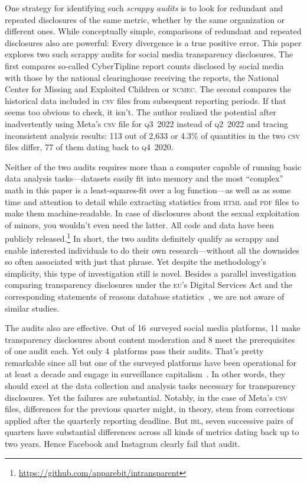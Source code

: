 \documentclass[nonacm,screen]{acmart}
\newcommand\V[1]{\textsc{\MakeLowercase{#1}}}
\begin{document}
\begin{itemize}
{One strategy for identifying such \emph{scrappy audits} is to look for redundant
and repeated disclosures of the same metric, whether by the same organization or
different ones. While conceptually simple, comparisons of redundant and repeated
disclosures also are powerful: Every divergence is a true positive error. This
paper explores two such scrappy audits for social media transparency
disclosures. The first compares so-called CyberTipline report counts disclosed
by social media with those by the national clearinghouse receiving the reports,
the National Center for Missing and Exploited Children or \V{NCMEC}. The second
compares the historical data included in \V{CSV} files from subsequent reporting
periods. If that seems too obvious to check, it isn't. The author realized the
potential after inadvertently using Meta's \V{CSV} file for \V{Q3}~2022 instead
of \V{Q2}~2022 and tracing inconsistent analysis results: 113 out of 2,633 or
4.3\% of quantities in the two \V{CSV} files differ, 77 of them dating back to
\V{Q4}~2020.

Neither of the two audits requires more than a computer capable of running basic
data analysis tasks---datasets easily fit into memory and the most ``complex''
math in this paper is a least-squares-fit over a log function---as well as as
some time and attention to detail while extracting statistics from \V{HTML} and
\V{PDF} files to make them machine-readable. In case of disclosures about the
sexual exploitation of minors, you wouldn't even need the latter. All code and
data have been publicly
released.\footnote{\label{fn:intransparent}\url{https://github.com/apparebit/intransparent}}
In short, the two audits definitely qualify as scrappy and enable interested
individuals to do their own research---without all the downsides so often
associated with just that phrase. Yet despite the methodology's simplicity, this
type of investigation still is novel. Besides a parallel investigation comparing
transparency disclosures under the \V{EU}'s Digital Services Act and the
corresponding statements of reasons database
statistics~\cite{TrujilloFagniea2024}, we are not aware of similar studies.

The audits also are effective. Out of 16~surveyed social media platforms, 11
make transparency disclosures about content moderation and 8 meet the
prerequisites of one audit each. Yet only 4~platforms pass their audits. That's
pretty remarkable since all but one of the surveyed platforms have been
operational for at least a decade and engage in surveillance
capitalism~\cite{Zuboff2019}. In other words, they should excel at the data
collection and analysis tasks necessary for transparency disclosures. Yet the
failures are substantial. Notably, in the case of Meta's \V{CSV} files,
differences for the previous quarter might, in theory, stem from corrections
applied after the quarterly reporting deadline. But \V{IRL}, seven successive
pairs of quarters have substantial differences across all kinds of metrics
dating back up to two years. Hence Facebook and Instagram clearly fail that
audit.

}
\end{itemize}
\end{document}
